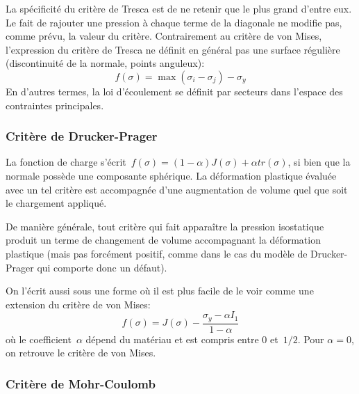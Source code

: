 La spécificité du critère de Tresca est de ne retenir que le plus grand d'entre eux. Le fait
de rajouter une pression à chaque terme de la diagonale ne modifie pas, comme prévu, la valeur du critère.
Contrairement au critère de von Mises, l'expression du critère de Tresca ne définit en général pas une
surface régulière (discontinuité de la normale, points anguleux):
\begin{equation} f(\sigma) = \max(\sigma_i - \sigma_j) - \sigma_y \end{equation}
En d'autres termes, la loi d'écoulement se définit par secteurs dans l'espace des contraintes principales.


\medskip
\subsubsection{Critère de Drucker-Prager}


\medskip
La fonction de charge s'écrit~$f(\sigma)=(1-\alpha)J(\sigma)+\alpha tr(\sigma)$, si
bien que la normale possède une composante sphérique.
La déformation plastique évaluée avec un tel critère est accompagnée d'une
augmentation de volume quel que soit le chargement appliqué.

De manière générale, tout critère qui fait apparaître la pression isostatique
produit un terme de changement de volume accompagnant la déformation plastique (mais
pas forcément positif, comme dans le cas du modèle de Drucker-Prager
qui comporte donc un défaut).

On l'écrit aussi sous une forme où il est plus facile de le voir comme une extension du critère de von Mises:
\begin{equation} f(\sigma) = J(\sigma) - \dfrac{\sigma_y-\alpha I_1}{1-\alpha} \end{equation}
où le coefficient~$\alpha$ dépend du matériau et est compris entre 0 et~$1/2$. Pour
$\alpha=0$, on retrouve le critère de von Mises.

\medskip
\subsubsection{Critère de Mohr-Coulomb}

